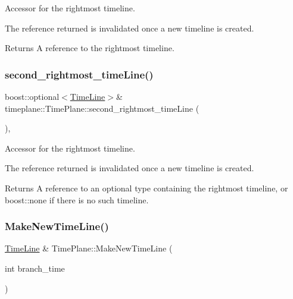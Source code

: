 Accessor for the rightmost timeline. 

The reference returned is invalidated once a new timeline is created. \begin{DoxyReturn}{Returns}
A reference to the rightmost timeline. 
\end{DoxyReturn}
\mbox{\label{classtimeplane_1_1_time_plane_a32da05c87dfe4bc33ec5cb87fd97297f}} 
\subsubsection{\texorpdfstring{second\+\_\+rightmost\+\_\+time\+Line()}{second\_rightmost\_timeLine()}}
{\footnotesize\ttfamily boost\+::optional$<$\hyperlink{classtimeplane_1_1_time_line}{Time\+Line}$>$\& timeplane\+::\+Time\+Plane\+::second\+\_\+rightmost\+\_\+time\+Line (\begin{DoxyParamCaption}{ }\end{DoxyParamCaption})\hspace{0.3cm}{\ttfamily [inline]}, {\ttfamily [noexcept]}}



Accessor for the rightmost timeline. 

The reference returned is invalidated once a new timeline is created. \begin{DoxyReturn}{Returns}
A reference to an optional type containing the rightmost timeline, or {\ttfamily boost\+::none} if there is no such timeline. 
\end{DoxyReturn}
\mbox{\label{classtimeplane_1_1_time_plane_ab8c82092c1c5c3f18c8677f8ce38662c}} 
\subsubsection{\texorpdfstring{Make\+New\+Time\+Line()}{MakeNewTimeLine()}}
{\footnotesize\ttfamily \hyperlink{classtimeplane_1_1_time_line}{Time\+Line} \& Time\+Plane\+::\+Make\+New\+Time\+Line (\begin{DoxyParamCaption}\item[{int}]{branch\+\_\+time }\end{DoxyParamCaption})}



